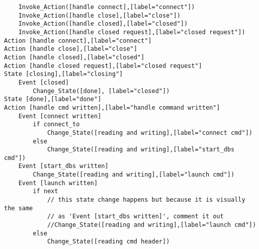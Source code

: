 \begin{verbatim}
	Invoke_Action([handle connect],[label="connect"])
	Invoke_Action([handle close],[label="close"])
	Invoke_Action([handle closed],[label="closed"])
	Invoke_Action([handle closed request],[label="closed request"])
Action [handle connect],[label="connect"]
Action [handle close],[label="close"]
Action [handle closed],[label="closed"]
Action [handle closed request],[label="closed request"]
State [closing],[label="closing"]
	Event [closed]
		Change_State([done], [label="closed"])
State [done],[label="done"]
Action [handle cmd written],[label="handle command written"]
	Event [connect written]
		if connect_to
			Change_State([reading and writing],[label="connect cmd"])
		else
			Change_State([reading and writing],[label="start_dbs cmd"])
	Event [start_dbs written]
		Change_State([reading and writing],[label="launch cmd"])
	Event [launch written]
		if next
			// this state change happens but because it is visually the same
			// as 'Event [start_dbs written]', comment it out
			//Change_State([reading and writing],[label="launch cmd"])
		else
			Change_State([reading cmd header])
\end{verbatim}
